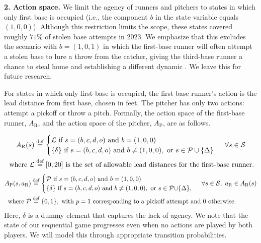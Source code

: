 \documentclass[11pt]{article}
\newcommand{\defeq}{\stackrel{\text{def}}{=}}
\begin{document}
    {\bf 2. Action space.} We limit the agency of runners and pitchers to states in which only first base is occupied 
    (i.e., the component $b$ in the state variable equals $(1,0,0)$). Although this restriction limits the scope, these states covered roughly $71\%$ of stolen base attempts in 2023. We emphasize that this  excludes the scenario with $b = (1, 0, 1)$ in which the first-base runner will often attempt a stolen base to lure a throw from the catcher, giving the third-base runner a chance to steal home and establishing a different dynamic \parencite{miller_first-and-third_2024}. We leave this for future research.
    
    For states in which only first base is occupied, the first-base runner's action is the lead distance from first base, chosen in feet. The pitcher has only two actions: attempt a pickoff or throw a pitch. Formally, the action space of the first-base runner, $A_{\text{R}}$, and the action space of the pitcher, $A_{\text{P}}$, are as follows.
    
    \begin{align}
    \label{eqn:runner_action_sapce}
        A_\text{R}(s) &\defeq \begin{cases}
            {\cal L} \text{ if } s = (b,c,d,o) \text{ and } b = (1,0,0)\\
            \{\delta\} \text{ if } s = (b,c,d,o) \text{ and } b \neq (1,0,0), \text{ or } s \in {\cal P} \cup \{\Delta\}
        \end{cases} \ \forall s \in {\cal S}\\
        \nonumber
        \text{ where } {\cal L} &\defeq [0,20] \text{ is the set of allowable lead distances for the first-base runner.}
    \end{align}
    \begin{align}
    \label{eqn:pitcher_action_sapce}
        A_{\text{P}}(s,a_\text{R}) &\defeq \begin{cases}
            {\cal P} \text{ if } s = (b,c,d,o) \text{ and } b = (1,0,0) \\
            \{\delta\} \text{ if } s = (b,c,d,o) \text{ and } b \neq (1,0,0), \text{ or } s \in {\cal P} {\cup} \{\Delta\},         \end{cases} \ \forall s \in {\cal S}, \ a_\text{R} \in A_\text{R}(s)\\
            \nonumber
        \text{ where } {\cal P} &\defeq \{0,1\}, \text{ with } p = 1 \text{ corresponding to a pickoff attempt and } 0 \text{  otherwise.}
    \end{align} 
    Here, $\delta$ is a dummy element that captures the lack of agency. We note that the state of our sequential game progresses even when no actions are played by both players. We will model this through appropriate transition probabilities.  
\end{document}
